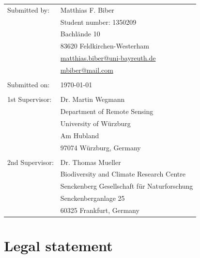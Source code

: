 \documentclass[12pt,a4paper, twoside, english]{article}
\begin{document}
\newpage 
\renewcommand{\arraystretch}{1.5}
\begin{tabular}{ll}
\par \bigskip
Submitted by: & Matthias F. Biber\\ \par
& Student number: 1350209 \\ \par
& Bachlände 10 \\ \par
& 83620 Feldkirchen-Westerham \\
& \href{mailto:matthias.biber@uni-bayreuth.de}{matthias.biber@uni-bayreuth.de}  \\
& \href{mailto:mbiber@mail.com}{mbiber@mail.com} \\
& \\
Submitted on: & \today \par \\
& \\ \par \bigskip
1st Supervisor: & Dr. Martin Wegmann \\
& Department of Remote Sensing \\
& University of Würzburg \\
& Am Hubland \\
& 97074 Würzburg, Germany \\ 
& \\ \par \bigskip
2nd Supervisor: & Dr. Thomas Mueller \\
& Biodiversity and Climate Research Centre \\
& Senckenberg Gesellschaft für Naturforschung \\
& Senckenberganlage 25 \\
& 60325 Frankfurt, Germany \\
\end{tabular}
\thispagestyle{empty}
\renewcommand{\arraystretch}{1}

\vspace{6ex}
\section*{Legal statement}
\renewcommand{\baselinestretch}{1.5}\normalsize

\end{document}
